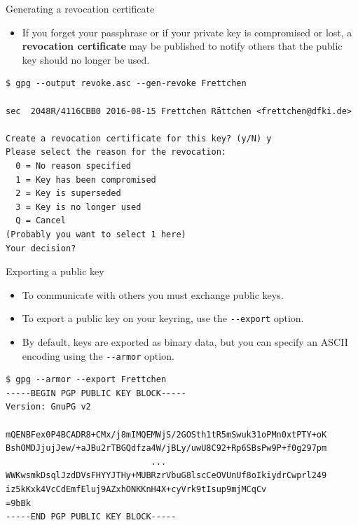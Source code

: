 \documentclass[%
mode=present,%
paper=smartboard,
size=20pt,
]{powerdot}
\newcommand\vsp{\vspace{-16mm}}
\newcommand{\clopt}[1]{\texttt{{-}#1}}
\begin{document}
\begin{slide}[method=direct]{Generating a revocation certificate}
  \begin{itemize}
  \item If you forget your passphrase or if your private key is
    compromised or lost, a \textbf{revocation certificate} may be
    published to notify others that the public key should no longer be
    used.
  \end{itemize}
\vsp
\begin{verbatim}
$ gpg --output revoke.asc --gen-revoke Frettchen

sec  2048R/4116CBB0 2016-08-15 Frettchen Rättchen <frettchen@dfki.de>

Create a revocation certificate for this key? (y/N) y
Please select the reason for the revocation:
  0 = No reason specified
  1 = Key has been compromised
  2 = Key is superseded
  3 = Key is no longer used
  Q = Cancel
(Probably you want to select 1 here)
Your decision? 
\end{verbatim}
\end{slide}

\begin{slide}[method=direct]{Exporting a public key}
  \begin{itemize}
  \item To communicate with others you must exchange public keys.
  \item To export a public key on your keyring, use the
    \clopt{-export} option.
  \item By default, keys are exported as binary data, but you can
    specify an ASCII encoding using the \clopt{-armor} option.
  \end{itemize}
\vsp
\begin{verbatim}
$ gpg --armor --export Frettchen
-----BEGIN PGP PUBLIC KEY BLOCK-----
Version: GnuPG v2

mQENBFex0P4BCADR8+CMx/j8mIMQEMWjS/2GOSth1tR5mSwuk31oPMn0xtPTY+oK
BshOMDJjujJew/+aJBu2rTBGQdfza4W/jBLy/uwU8C92+Rp6SBsPw9P+f0g297pm
                             ...
WWKwsmkDsqlJzdDVsFHYYJTHy+MUBRzrVbuG8lscCeOVUnUf8oIkiydrCwprl249
iz5kKxk4VcCdEmfEluj9AZxhONKKnH4X+cyVrk9tIsup9mjMCqCv
=9bBk
-----END PGP PUBLIC KEY BLOCK-----
\end{verbatim}
\end{slide}
\end{document}
